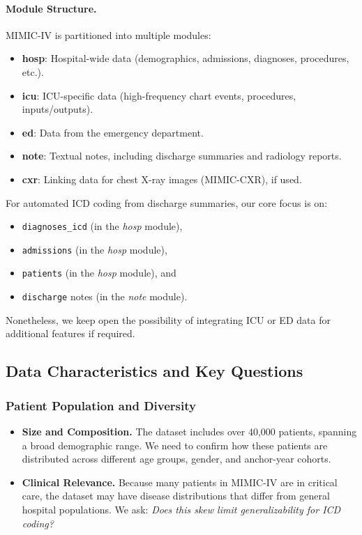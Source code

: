 \documentclass[12pt,a4paper]{report}
\begin{document}
\paragraph{Module Structure.}
MIMIC-IV is partitioned into multiple modules:
\begin{itemize}
  \item \textbf{hosp}: Hospital-wide data (demographics, admissions, diagnoses, procedures, etc.).
  \item \textbf{icu}: ICU-specific data (high-frequency chart events, procedures, inputs/outputs).
  \item \textbf{ed}: Data from the emergency department.
  \item \textbf{note}: Textual notes, including discharge summaries and radiology reports.
  \item \textbf{cxr}: Linking data for chest X-ray images (MIMIC-CXR), if used.
\end{itemize}
For automated ICD coding from discharge summaries, our core focus is on:
\begin{itemize}
  \item \texttt{diagnoses\_icd} (in the \emph{hosp} module),
  \item \texttt{admissions} (in the \emph{hosp} module),
  \item \texttt{patients} (in the \emph{hosp} module), and
  \item \texttt{discharge} notes (in the \emph{note} module).
\end{itemize}
Nonetheless, we keep open the possibility of integrating ICU or ED data for additional features if required.

\subsection{Data Characteristics and Key Questions}

\subsubsection{Patient Population and Diversity}
\begin{itemize}
    \item \textbf{Size and Composition.} The dataset includes over 40,000 patients, spanning a broad demographic range. We need to confirm how these patients are distributed across different age groups, gender, and anchor-year cohorts.
    \item \textbf{Clinical Relevance.} Because many patients in MIMIC-IV are in critical care, the dataset may have disease distributions that differ from general hospital populations. We ask: \emph{Does this skew limit generalizability for ICD coding?}
\end{itemize}
\end{document}
